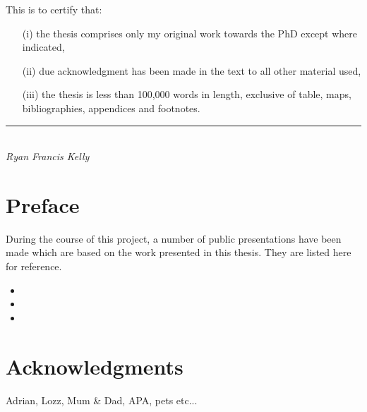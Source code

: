 This is to certify that:
\begin{itemize}
\item[(i)] the thesis comprises only my original work towards the PhD except where indicated,
\item[(ii)] due acknowledgment has been made in the text to all other material used,
\item[(iii)] the thesis is less than 100,000 words in length, exclusive of table, maps, bibliographies, appendices and footnotes.
\end{itemize}
\vspace{3cm}
\rule{70mm}{0.1mm}\\
\emph{Ryan Francis Kelly}

\chapter*{Preface} %
During the course of this project, a number of public presentations have been made which are based on the work
presented in this thesis. They are listed here for reference.
\nobibliography*
\begin{itemize}
\item {}
\item {}
\item {}
\end{itemize}


\chapter*{Acknowledgments} %

Adrian, Lozz, Mum \& Dad, APA, pets etc...

\singlespace    %
\tableofcontents
\listoftables
\listoffigures

\newpage
{}









\appendix


\singlespace




